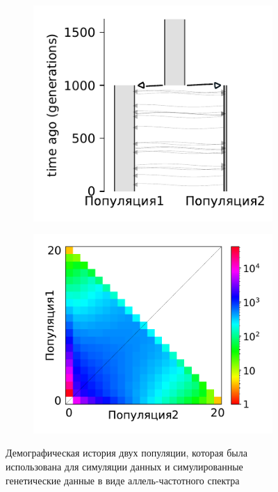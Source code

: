 \begin{figure}[ht]
    \centering
    \begin{subfigure}[b]{.4\textwidth}
    \includegraphics[width=\textwidth]{images_experiments/simulation_1/2pop/picture_1pop_ground_truth_grey.pdf}
    \caption{}
    \label{fig:part2:experiments:simulated_2:data_1}
    \end{subfigure}%
    \begin{subfigure}[b]{.4\textwidth}
    \includegraphics[width=\textwidth]{images_experiments/simulation_1/2pop/2d_plot.pdf}
    \caption{}
    \label{fig:part2:experiments:simulated_2:data_2}
    \end{subfigure}
    \caption{Демографическая история двух популяции, которая была использована для симуляции данных и симулированные генетические данные в виде аллель-частотного спектра}
    \label{fig:part2:experiments:simulated_2:data}
\end{figure}

